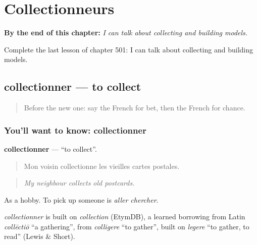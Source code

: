 
\chapter{Collectionneurs}
\label{ch:fr-collectionneurs}

\begin{chapteropening}
\textbf{By the end of this chapter:} \emph{I can talk about collecting and building models.}

Complete the last lesson of chapter 501: I can talk about collecting and building models.
\end{chapteropening}

\section[collectionner]{collectionner — to collect}

\label{lesson:FR-C501-collectionner}



\begin{quote}
Before the new one: say the French for bet, then the French for chance.
\end{quote}

\subsection*{You'll want to know: collectionner}
\textbf{collectionner} — \textquotedblleft{}to collect\textquotedblright{}.

\begin{quote}
Mon voisin collectionne les vieilles cartes postales.
\end{quote}

\begin{quote}
\emph{My neighbour collects old postcards.}
\end{quote}

As a hobby. To pick up someone is \emph{aller chercher}.

\begin{cousinweb}
\emph{collectionner} is built on \emph{collection} (EtymDB), a learned borrowing from Latin \emph{collēctiō} \textquotedblleft{}a gathering\textquotedblright{}, from \emph{colligere} \textquotedblleft{}to gather\textquotedblright{}, built on \emph{legere} \textquotedblleft{}to gather, to read\textquotedblright{} (Lewis \& Short).
\end{cousinweb}

